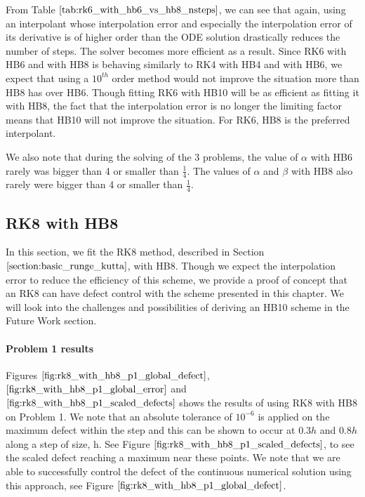 From Table $\ref{tab:rk6_with_hb6_vs_hb8_nsteps}$, we can see that again, using an interpolant whose interpolation error and especially the interpolation error of its derivative is of higher order than the ODE solution drastically reduces the number of steps. The solver becomes more efficient as a result. Since RK6 with HB6 and with HB8 is behaving similarly to RK4 with HB4 and with HB6, we expect that using a $10^{th}$ order method would not improve the situation more than HB8 has over HB6. Though fitting RK6 with HB10 will be as efficient as fitting it with HB8, the fact that the interpolation error is no longer the limiting factor means that HB10 will not improve the situation. For RK6, HB8 is the preferred interpolant.  

We also note that during the solving of the 3 problems, the value of $\alpha$ with HB6 rarely was bigger than 4 or smaller than $\frac{1}{4}$. The values of $\alpha$ and $\beta$ with HB8 also rarely were bigger than 4 or smaller than $\frac{1}{4}$. 

\subsection{RK8 with HB8}
In this section, we fit the RK8 method, described in Section $\ref{section:basic_runge_kutta}$, with HB8. Though we expect the interpolation error to reduce the efficiency of this scheme, we provide a proof of concept that an RK8 can have defect control with the scheme presented in this chapter. We will look into the challenges and possibilities of deriving an HB10 scheme in the Future Work section. 

\paragraph{Problem 1 results}
Figures $\ref{fig:rk8_with_hb8_p1_global_defect}$, $\ref{fig:rk8_with_hb8_p1_global_error}$ and $\ref{fig:rk8_with_hb8_p1_scaled_defects}$ shows the results of using RK8 with HB8 on Problem 1. We note that an absolute tolerance of $10^{-6}$ is applied on the maximum defect within the step and this can be shown to occur at $0.3h$ and $0.8h$ along a step of size, h. See Figure $\ref{fig:rk8_with_hb8_p1_scaled_defects}$, to see the scaled defect reaching a maximum near these points. We note that we are able to successfully control the defect of the continuous numerical solution using this approach, see Figure $\ref{fig:rk8_with_hb8_p1_global_defect}$. 
 

